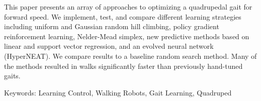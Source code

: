 
This paper presents an array of approaches to optimizing a quadrupedal
gait for forward speed.  We implement, test, and compare different
learning strategies including uniform and Gaussian random hill
climbing, policy gradient reinforcement learning\cite{kohl},
Nelder-Mead simplex\cite{nm}, new predictive methods based on linear
and support vector regression, and an evolved neural network
(HyperNEAT)\cite{2}.  We compare results to a baseline random search
method.  Many of the methods resulted in walks significantly faster
than previously hand-tuned gaits.



Keywords: Learning Control, Walking Robots, Gait Learning, Quadruped
